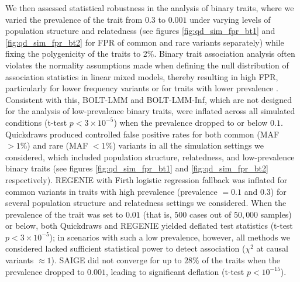 %
We then assessed statistical robustness in the analysis of binary traits, where we varied the prevalence of the trait from $0.3$ to $0.001$ under varying levels of population structure and relatedness (see figures \ref{fig:qd_sim_fpr_bt1} and \ref{fig:qd_sim_fpr_bt2} for FPR of common and rare variants separately) while fixing the polygenicity of the traits to 2\%. 
%
Binary trait association analysis often violates the normality assumptions made when defining the null distribution of association statistics in linear mixed models, thereby resulting in high FPR, particularly for lower frequency variants or for traits with lower prevalence \cite{zhou2018efficiently}.
%
Consistent with this, BOLT-LMM and BOLT-LMM-Inf, which are not designed for the analysis of low-prevalence binary traits, were inflated across all simulated conditions (t-test $p < 3 \times 10^{-5}$) when the prevalence dropped to or below $0.1$. 
%
Quickdraws produced controlled false positive rates for both common (MAF $> 1\%$) and rare (MAF $< 1\%$) variants in all the simulation settings we considered, which included population structure, relatedness, and low-prevalence binary traits (see figures \ref{fig:qd_sim_fpr_bt1} and \ref{fig:qd_sim_fpr_bt2} respectively).
%
REGENIE with Firth logistic regression fallback was inflated for common variants in traits with high prevalence (prevalence $=0.1$ and $0.3$) for several population structure and relatedness settings we considered.
%
When the prevalence of the trait was set to $0.01$ (that is, $500$ cases out of $50{,}000$ samples) or below, both Quickdraws and REGENIE yielded deflated test statistics (t-test $p < 3 \times 10^{-5}$); in scenarios with such a low prevalence, however, all methods we considered lacked sufficient statistical power to detect association ($\chi^2$ at causal variants ${\approx}1$).
%
SAIGE did not converge for up to $28\%$ of the traits when the prevalence dropped to $0.001$, leading to significant deflation (t-test $p < 10^{-15}$). 
%

